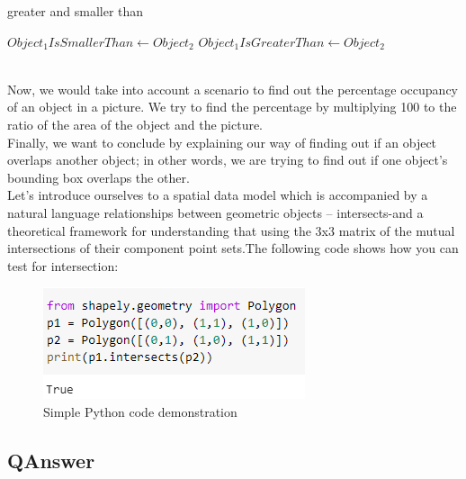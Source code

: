 \documentclass[12pt]{article}
\begin{document}
\begin{algorithm}
  \caption{greater and smaller than}\label{algo:algo}
  \begin{algorithmic}[1]
        \STATE $Object_1 Is Smaller Than
\gets Object_2$
\ELSE
                \STATE $Object_1 Is Greater Than
\gets Object_2$
        \ENDIF
\ENDIF   
  \end{algorithmic}
\end{algorithm}
\\Now, we would take into account a scenario to find out the percentage occupancy of an object in a picture. We try to find the percentage by multiplying 100 to the ratio of the area of the object and the picture.\\Finally, we want to conclude by explaining our way of finding out if an object overlaps another object; in other words, we are trying to find out if one object's bounding box overlaps the other.\\Let's introduce ourselves to a spatial data model which is accompanied by a natural language relationships between geometric objects – intersects-and a theoretical framework for understanding that using the 3x3 matrix of the mutual intersections of their component point sets.The following code shows how you can test for intersection:\\
 \begin{figure}[!h]
\center
\includegraphics{Untitled.png}

\caption{Simple Python code demonstration}
\end{figure} 
\subsection{QAnswer}
\end{document}
